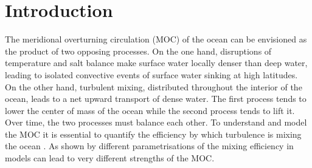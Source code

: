 \section {Introduction}

The meridional overturning circulation (MOC) of the ocean can be envisioned as
the product of two opposing processes. On the one hand, disruptions of
temperature and salt balance make surface water locally denser than deep water,
leading to isolated convective events of surface water sinking at high
latitudes. On the other hand, turbulent mixing, distributed throughout the
interior of the ocean, leads to a net upward transport of dense water. The
first process tends to lower the center of mass of the ocean while the second
process tends to lift it. Over time, the two processes must balance each other.
To understand and model the MOC it is essential to quantify the efficiency by
which turbulence is mixing the ocean \cite{Jayne}. As shown by \cite{Nilsson}
different parametrisations of the mixing efficiency in models can lead to very
different strengths of the MOC.

